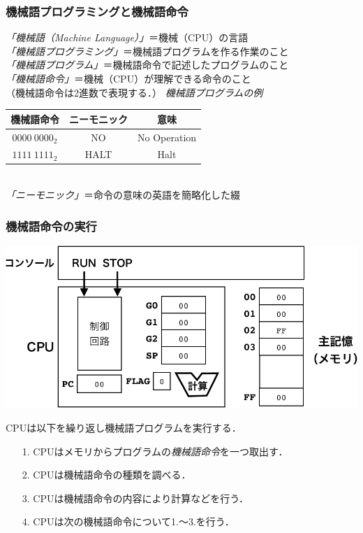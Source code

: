 \documentclass[handout]{beamer}        %
\begin{document}
\begin{frame}
  \frametitle{機械語プログラミングと機械語命令}
  \emph{「機械語（Machine Language）」}＝機械（CPU）の言語\\
  \vfill
  \vfill
  \emph{「機械語プログラミング」}＝機械語プログラムを作る作業のこと\\
  \vfill
  \emph{「機械語プログラム」}＝機械語命令で記述したプログラムのこと\\
  \vfill
  \emph{「機械語命令」}＝機械（CPU）が理解できる命令のこと\\
  （機械語命令は2進数で表現する．）
  \vfill
  \emph{機械語プログラムの例}\\
       {\ttfamily\small\begin{center}
         \begin{tabular}{|c|c|c|} \hline
           機械語命令 & ニーモニック & 意味\\
           \hline
           $0000~0000_{2}$ & NO & No Operation \\
           $1111~1111_{2}$ & HALT & Halt \\
           \hline
         \end{tabular}\\
       \emph{「ニーモニック」}＝命令の意味の英語を簡略化した綴
       \end{center}}
\end{frame}

\begin{frame}
  \frametitle{機械語命令の実行}
  \vfill
  \centerline{\includegraphics[scale=0.7]{Fig/exec-crop.pdf}}
  \vfill
  CPUは以下を繰り返し機械語プログラムを実行する．
  \begin{enumerate}
  \item[1.] CPUはメモリからプログラムの\emph{機械語命令}を一つ取出す．
  \item[2.] CPUは機械語命令の種類を調べる．
  \item[3.] CPUは機械語命令の内容により計算などを行う．
  \item[4.] CPUは次の機械語命令について1.〜3.を行う．
  \end{enumerate}
  \vfill
\end{frame}
\end{document}
